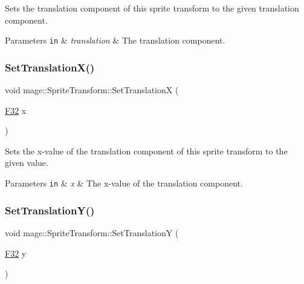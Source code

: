 Sets the translation component of this sprite transform to the given translation component.


\begin{DoxyParams}[1]{Parameters}
\mbox{\tt in}  & {\em translation} & The translation component. \\
\hline
\end{DoxyParams}
\hypertarget{classmage_1_1_sprite_transform_aa30ede51f36c31b5a35ebe7b60545e1c}{}\label{classmage_1_1_sprite_transform_aa30ede51f36c31b5a35ebe7b60545e1c} 
\subsubsection{\texorpdfstring{Set\+Translation\+X()}{SetTranslationX()}}
{\footnotesize\ttfamily void mage\+::\+Sprite\+Transform\+::\+Set\+TranslationX (\begin{DoxyParamCaption}\item[{\hyperlink{namespacemage_aa97e833b45f06d60a0a9c4fc22ae02c0}{F32}}]{x }\end{DoxyParamCaption})\hspace{0.3cm}{\ttfamily [noexcept]}}

Sets the x-\/value of the translation component of this sprite transform to the given value.


\begin{DoxyParams}[1]{Parameters}
\mbox{\tt in}  & {\em x} & The x-\/value of the translation component. \\
\hline
\end{DoxyParams}
\hypertarget{classmage_1_1_sprite_transform_a3086df30d1ed6813db07bc78ef47df6c}{}\label{classmage_1_1_sprite_transform_a3086df30d1ed6813db07bc78ef47df6c} 
\subsubsection{\texorpdfstring{Set\+Translation\+Y()}{SetTranslationY()}}
{\footnotesize\ttfamily void mage\+::\+Sprite\+Transform\+::\+Set\+TranslationY (\begin{DoxyParamCaption}\item[{\hyperlink{namespacemage_aa97e833b45f06d60a0a9c4fc22ae02c0}{F32}}]{y }\end{DoxyParamCaption})\hspace{0.3cm}{\ttfamily [noexcept]}}

